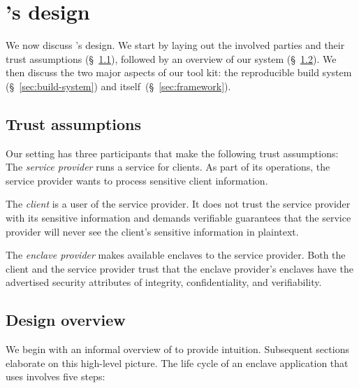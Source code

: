 \section{\Tool{}'s design}
\label{sec:design}

We now discuss \tool{}'s design.  We start by laying out the involved parties
and their trust assumptions (\S~\ref{sec:trust-assumptions}), followed by an
overview of our system (\S~\ref{sec:overview}).  We then discuss the two major
aspects of our tool kit: the reproducible build system
(\S~\ref{sec:build-system}) and \tool{} itself~(\S~\ref{sec:framework}).

\subsection{Trust assumptions}
\label{sec:trust-assumptions}

Our setting has three participants that make the following trust assumptions:
%
The \emph{service provider} runs a service for clients.  As part of its
operations, the service provider wants to process sensitive client information.

The \emph{client} is a user of the service provider.  It does not trust the
service provider with its sensitive information and demands verifiable
guarantees that the service provider will never see the client's sensitive
information in plaintext.

The \emph{enclave provider} makes available enclaves to the service provider.
Both the client and the service provider trust that the enclave provider's
enclaves have the advertised security attributes of integrity, confidentiality,
and verifiability.

\subsection{Design overview}
\label{sec:overview}

We begin with an informal overview of \tool{} to provide intuition.  Subsequent
sections elaborate on this high-level picture.  The life cycle of an enclave
application that uses \tool{} involves five steps:

